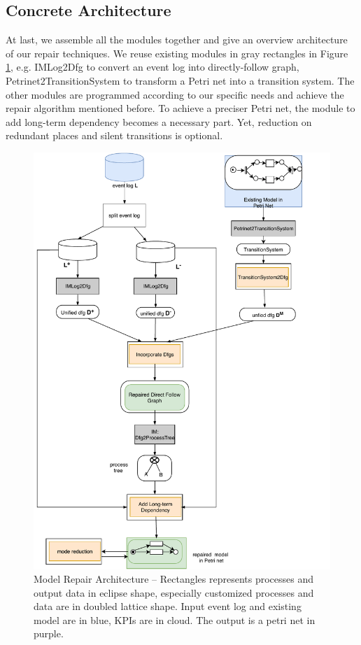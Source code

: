 \subsection{Concrete Architecture}
At last, we assemble all the modules together and give an overview architecture of our repair techniques.  We reuse existing modules in gray rectangles in Figure \ref{fig:architecture}, e.g. IMLog2Dfg to convert an event log into directly-follow graph, Petrinet2TransitionSystem to transform a Petri net into a transition system. The other modules are programmed according to our specific needs and achieve the repair algorithm mentioned before. To achieve a preciser Petri net, the module to add long-term dependency becomes a necessary part. Yet, reduction on redundant places and silent transitions is optional. 
\begin{figure}
	\includegraphics[height=0.9\textheight]{figures/algorithm/FD_architeccture_detail.pdf}
	\caption[Model Repair Architecture]{Model Repair Architecture -- \small Rectangles represents processes and output data in eclipse shape, especially customized processes and data are in doubled lattice shape. Input event log and existing model are in blue, KPIs are in cloud. The output is a petri net in purple.}
	\label{fig:architecture}
\end{figure} 
